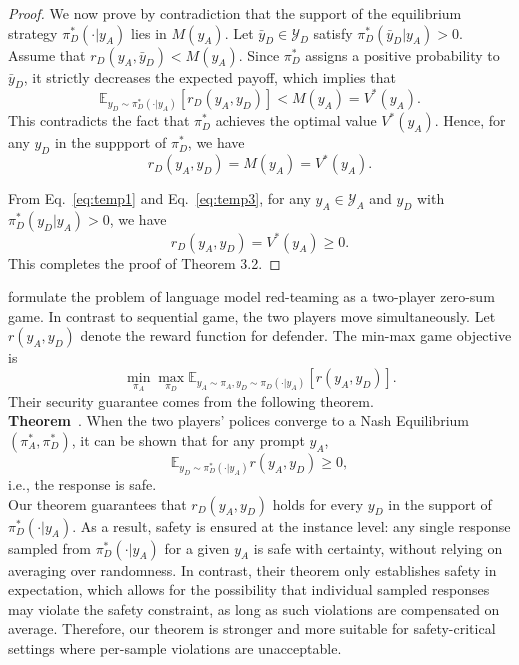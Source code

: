 \documentclass[11pt, letterpaper]{template}
\theoremstyle{plain}
\theoremstyle{definition}
\theoremstyle{remark}
\begin{document}
\begin{proof}
We now prove by contradiction that the support of the equilibrium strategy $\pi_D^{*}(\cdot | y_A)$ lies in $M(y_A)$. Let $\bar{y}_D \in \mathcal{Y}_D$ satisfy $\pi_D^{*}(\bar{y}_D | y_A) > 0$. Assume that $r_D(y_A,\bar{y}_D) < M(y_A).$ 
Since $\pi_D^{*}$ assigns a positive probability to $\bar{y}_D$, it strictly decreases the expected payoff, which implies that 
\[  \mathbb{E}_{y_D \sim \pi_D^{*}(\cdot | y_A)}[r_D(y_A,y_D)] < M(y_A) = V^{*}(y_A). \]
This contradicts the fact that $\pi_D^{*}$ achieves the optimal value $V^{*}(y_A)$. Hence, for any $y_D$ in the suppport of $\pi_D^{*}$, we have
\begin{equation}
    \label{eq:temp3}
    r_D(y_A,y_D) = M(y_A) =V^{*}(y_A).
\end{equation}

From Eq.~\eqref{eq:temp1} and Eq.~\eqref{eq:temp3}, for any $y_A \in \mathcal{Y}_A$ and $y_D$ with $\pi_D^{*}(y_D|y_A) >0$, we have
\begin{equation}
    r_D(y_A,y_D)=V^{*}(y_A) \geq 0.
\end{equation}
This completes the proof of Theorem 3.2.
\end{proof}


\begin{tcolorbox}[
  title=Compared with Normal-Form Game,
  colback=white,
  colframe=black,
  boxrule=0.8pt,
  arc=2pt,
  left=6pt,
  right=6pt,
  top=6pt,
  bottom=6pt
]

\citet{liu2025chasing} formulate the problem of language model red-teaming as a two-player zero-sum  game. In contrast to   sequential game, the two players move simultaneously.  Let $r(y_A,y_D)$ denote the reward function for defender. The min-max game  objective is 
\begin{equation}
    \min_{\pi_A}\max_{\pi_D}\mathbb{E}_{y_A \sim \pi_A,y_D\sim \pi_D(\cdot |y_A)}[r(y_A,y_D)].
\end{equation}
Their security guarantee comes from the following theorem. \\

\textbf{Theorem}~\citep{liu2025chasing}.  When the two players' polices converge to a Nash Equilibrium $(\pi_A^{*},\pi_D^{*})$, it can be shown that for any prompt $y_A$, 
\begin{equation}
    \label{eq:temp5}
    \mathbb{E}_{y_D \sim \pi_D^{*}(\cdot | y_A)} r(y_A,y_D) \geq 0,
\end{equation}
i.e., the response is safe. \\

Our theorem guarantees that $r_D(y_A,y_D)$ holds for every $y_D$ in the support of $\pi_D^{*}(\cdot | y_A)$.  As a result, safety is ensured at the instance level: any single response sampled from $\pi_D^{*}(\cdot |y_A)$ for a given $y_A$ is safe with certainty, without relying on averaging over randomness.
In contrast, their theorem only establishes safety in expectation, which allows for the possibility that individual sampled responses may violate the safety constraint, as long as such violations are compensated on average. Therefore, our theorem is  stronger and more suitable for safety-critical settings where per-sample violations are unacceptable.
\end{tcolorbox}
\end{document}
